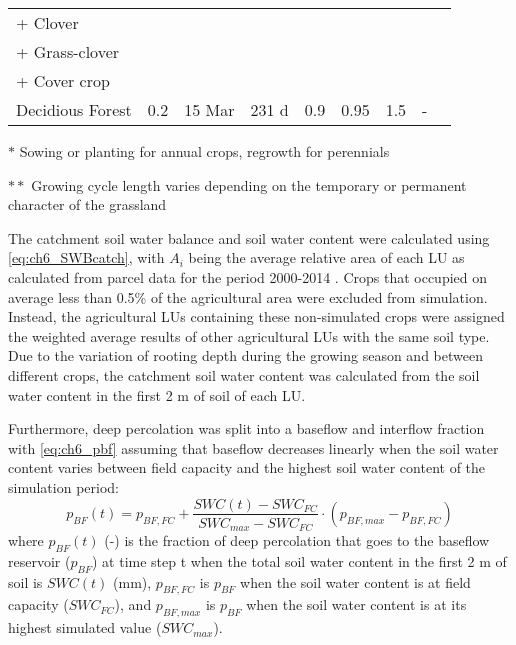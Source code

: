 \begin{landscape}
\begin{table}[htbp]
{\begin{threeparttable}
\begin{tabular}{lrrrrrrrr}
      + Clover &       &       &       &       &       &       &       &  \\
      + Grass-clover  &       &       &       &       &       &       &       &  \\
      + Cover crop &       &       &       &       &       &       &       &  \\
Decidious Forest & \multicolumn{1}{c}{0.2} & \multicolumn{1}{c}{15 Mar} & \multicolumn{1}{c}{231 \si{d}} & \multicolumn{1}{c}{0.9} & \multicolumn{1}{c}{0.95} & \multicolumn{1}{c}{1.5} & \multicolumn{1}{c}{-} & \multicolumn{1}{c}{\parencite{allen1998}} \\
\bottomrule				
    	\end{tabular}%
    	\begin{tablenotes}
        \item[$\ast$] Sowing or planting for annual crops, regrowth for perennials
        \item[$\ast\ast$] Growing cycle length varies depending on the temporary or permanent character of the grassland 
    	\end{tablenotes}
        \end{threeparttable}
              }
  \label{tab:ch6_croppar}%
\end{table}%
\end{landscape}
 
The catchment soil water balance and soil water content were calculated using \autoref{eq:ch6_SWBcatch}, with $A_i$ being the average relative area of each LU as calculated from parcel data for the period 2000-2014 \parencite{vlm2014}. Crops that occupied on average less than 0.5\% of the agricultural area were excluded from simulation. Instead, the agricultural LUs containing these non-simulated crops were assigned the weighted average results of other agricultural LUs with the same soil type. Due to the variation of rooting depth during the growing season and between different crops, the catchment soil water content was calculated from the soil water content in the first 2 m of soil of each LU. 

Furthermore, deep percolation was split into a baseflow and interflow fraction with \autoref{eq:ch6_pbf} assuming that baseflow decreases linearly when the soil water content varies between field capacity and the highest soil water content of the simulation period:
\begin{equation}
 p_{BF}(t)=p_{BF,FC} + \dfrac{SWC(t)-SWC_{FC}}{SWC_{max}-SWC_{FC}} \cdot \left(p_{BF,max} -p_{BF,FC}\right) 
  \label{eq:ch6_pbf}
\end{equation}
where $p_{BF}(t)$ (-) is the fraction of deep percolation that goes to the baseflow reservoir ($p_{BF}$) at time step t when the total soil water content in the first 2 m of soil is $SWC(t)$ (mm), $p_{BF,FC}$ is $p_{BF}$ when the soil water content is at field capacity ($SWC_{FC}$), and $p_{BF,max}$ is $p_{BF}$ when the soil water content is at its highest simulated value ($SWC_{max}$). 

